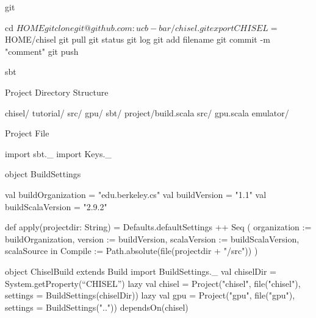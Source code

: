 \documentclass[xcolor=pdflatex,dvipsnames,table]{beamer}
\begin{document}
\begin{frame}[fragile]{git}
\begin{FramedVerb}
cd ${HOME}
git clone git@github.com:ucb-bar/chisel.git
export CHISEL=${HOME}/chisel
git pull
git status 
git log
git add filename
git commit -m "comment"
git push
\end{FramedVerb}
\end{frame}

\begin{frame}[fragile]{sbt}
\end{frame}

\begin{frame}[fragile]{Project Directory Structure}
\begin{FramedSemiVerb}
chisel/
  tutorial/
  src/
gpu/
  sbt/
    project/build.scala 
  src/                  
    gpu.scala           
  emulator/             
\end{FramedSemiVerb}

\end{frame}

\begin{frame}[fragile]{Project File}

{
\begin{scala}
import sbt._
import Keys._

object BuildSettings {
  val buildOrganization = "edu.berkeley.cs"
  val buildVersion = "1.1"
  val buildScalaVersion = "2.9.2"

  def apply(projectdir: String) = {
    Defaults.defaultSettings ++ Seq (
      organization := buildOrganization,
      version      := buildVersion,
      scalaVersion := buildScalaVersion,
      scalaSource in Compile := Path.absolute(file(projectdir + "/src"))
    )
  }
}

object ChiselBuild extends Build {
  import BuildSettings._
  val chiselDir = System.getProperty(``CHISEL'')
  lazy val chisel = 
    Project("chisel", file("chisel"), 
            settings = BuildSettings(chiselDir))
  lazy val gpu =
    Project("gpu", file("gpu"), 
            settings = BuildSettings("..")) 
      dependsOn(chisel)
}
\end{scala}
}

\end{frame}
\end{document}
